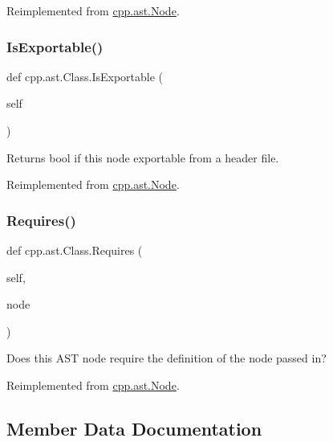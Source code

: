Reimplemented from \mbox{\hyperlink{classcpp_1_1ast_1_1Node_a684ee9a357168e7e07a24fc6812f66e6}{cpp.\+ast.\+Node}}.

\mbox{\label{classcpp_1_1ast_1_1Class_a1ab749f8cfddb0903c6484791f70f42e}} 
\subsubsection{\texorpdfstring{IsExportable()}{IsExportable()}}
{\footnotesize\ttfamily def cpp.\+ast.\+Class.\+Is\+Exportable (\begin{DoxyParamCaption}\item[{}]{self }\end{DoxyParamCaption})}

\begin{DoxyVerb}Returns bool if this node exportable from a header file.\end{DoxyVerb}
 

Reimplemented from \mbox{\hyperlink{classcpp_1_1ast_1_1Node_a313273874ccf578485006d4000128234}{cpp.\+ast.\+Node}}.

\mbox{\label{classcpp_1_1ast_1_1Class_a347673e0a2a7b840b7d2d1cae13977f7}} 
\subsubsection{\texorpdfstring{Requires()}{Requires()}}
{\footnotesize\ttfamily def cpp.\+ast.\+Class.\+Requires (\begin{DoxyParamCaption}\item[{}]{self,  }\item[{}]{node }\end{DoxyParamCaption})}

\begin{DoxyVerb}Does this AST node require the definition of the node passed in?\end{DoxyVerb}
 

Reimplemented from \mbox{\hyperlink{classcpp_1_1ast_1_1Node_a31ae211f954a8c578ef16226df5ac8c8}{cpp.\+ast.\+Node}}.



\subsection{Member Data Documentation}
\mbox{\label{classcpp_1_1ast_1_1Class_a5665eb67314a075d4e0ff91accbde5d1}} 
